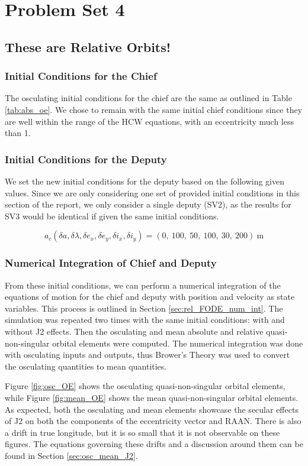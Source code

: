 \section{Problem Set 4}
\subsection{These are Relative Orbits!}

\subsubsection{Initial Conditions for the Chief} 
The osculating initial conditions for the chief are the same as outlined in Table \ref{tab:abs_oe}. We chose to remain with the same initial chief conditions since they are well within the range of the HCW equations, with an eccentricity much less than 1. 

\subsubsection{Initial Conditions for the Deputy} \label{sec:ic_for_pset4}

We set the new initial conditions for the deputy based on the following given values. Since we are only considering one set of provided initial conditions in this section of the report, we only consider a single deputy (SV2), as the results for SV3 would be identical if given the same initial conditions.

\[
a_c (\delta a, \delta \lambda, \delta e_x, \delta e_y, \delta i_x, \delta i_y) = (0,\ 100,\ 50,\ 100,\ 30,\ 200)~\text{m}
\]

\subsubsection{Numerical Integration of Chief and Deputy}
From these initial conditions, we can perform a numerical integration of the equations of motion for the chief and deputy with position and velocity as state variables. This process is outlined in Section \ref{sec:rel_FODE_num_int}. The simulation was repeated two times with the same initial conditions: with and without J2 effects. Then the osculating and mean absolute and relative quasi-non-singular orbital elements were computed. The numerical integration was done with osculating inputs and outputs, thus Brower's Theory was used to convert the osculating quantities to mean quantities. 

Figure \ref{fig:osc_OE} shows the osculating quasi-non-singular orbital elements, while Figure \ref{fig:mean_OE} shows the mean quasi-non-singular orbital elements. As expected, both the osculating and mean elements showcase the secular effects of J2 on both the components of the eccentricity vector and RAAN. There is also a drift in true longitude, but it is so small that it is not observable on these figures. The equations governing these drifts and a discussion around them can be found in Section \ref{sec:osc_mean_J2}.

